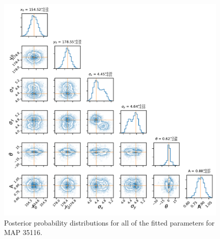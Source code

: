 \begin{figure}
    \centering
    \includegraphics{CodeAndFigures/FocusingLMTPosteriorCorner.pdf}
    \caption{Posterior probability distributions for all of the fitted parameters for MAP 35116.}
    \label{fig:lmtpostAna}
\end{figure}

